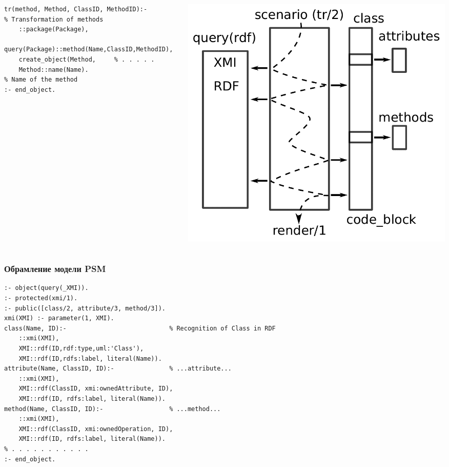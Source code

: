 \documentclass[10pt]{beamer}
\begin{document}
\begin{frame}[fragile]
\begin{columns}
\begin{column}{0.6\textwidth}
\begin{verbatim}
tr(method, Method, ClassID, MethodID):-              % Transformation of methods
    ::package(Package),
    query(Package)::method(Name,ClassID,MethodID),
    create_object(Method,     % . . . . .
    Method::name(Name).                              % Name of the method
:- end_object.
\end{verbatim}
    \end{column}
    \begin{column}{0.4\linewidth}
      \includegraphics[width=1\linewidth]{scenario.pdf}
    \end{column}
  \end{columns}
\end{frame}

\begin{frame}[fragile]
  \frametitle{Обрамление модели PSM}
\begin{verbatim}
:- object(query(_XMI)).
:- protected(xmi/1).
:- public([class/2, attribute/3, method/3]).
xmi(XMI) :- parameter(1, XMI).
class(Name, ID):-                            % Recognition of Class in RDF
    ::xmi(XMI),
    XMI::rdf(ID,rdf:type,uml:'Class'),
    XMI::rdf(ID,rdfs:label, literal(Name)).
attribute(Name, ClassID, ID):-               % ...attribute...
    ::xmi(XMI),
    XMI::rdf(ClassID, xmi:ownedAttribute, ID),
    XMI::rdf(ID, rdfs:label, literal(Name)).
method(Name, ClassID, ID):-                  % ...method...
    ::xmi(XMI),
    XMI::rdf(ClassID, xmi:ownedOperation, ID),
    XMI::rdf(ID, rdfs:label, literal(Name)).
% . . . . . . . . . . .
:- end_object.
\end{verbatim}
\end{frame}
\end{document}
